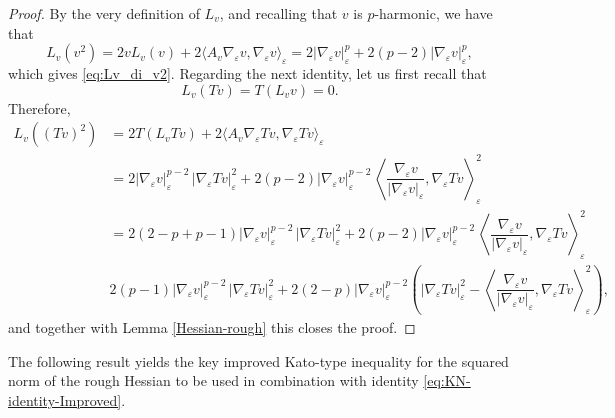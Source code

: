 \documentclass[10pt]{amsart}
\numberwithin{equation}{section}
\theoremstyle{definition}
\begin{document}
	\begin{proof}
		By the very definition of $L_v$, and recalling that $v$ is $p$-harmonic, we have that
		\begin{equation}
			L_{v}(v^2) = 2v L_{v}(v) + 2 \langle A_{v}\nabla_{\varepsilon}v, \nabla_{\varepsilon}v\rangle_{\varepsilon} = 2|\nabla_{\varepsilon}v|^{p}_{\varepsilon}+ 2(p-2) |\nabla_{\varepsilon}v|_{\varepsilon}^{p},
		\end{equation}
		\noindent which gives \eqref{eq:Lv_di_v2}.
		Regarding the next identity, let us first recall that
		\begin{equation}
			L_{v}(T v) = T (L_{v}v) =0.
		\end{equation}
		Therefore,
		\begin{equation}
			\begin{aligned}
				L_{v}((T v)^2) &= 2 T (L_{v}T v) + 2\langle A_v \nabla_{\varepsilon}T v, \nabla_{\varepsilon}T v \rangle_{\varepsilon}\\
				&= 2 |\nabla_{\varepsilon}v|_{\varepsilon}^{p-2}\,|\nabla_{\varepsilon}T v|_{\varepsilon}^{2} + 2(p-2)|\nabla_{\varepsilon}v|_{\varepsilon}^{p-2}\, \left\langle\dfrac{\nabla_{\varepsilon}v}{|\nabla_{\varepsilon}v|_{\varepsilon}}, \nabla_{\varepsilon}T v\right\rangle_{\varepsilon}^2\\
				&=2 (2-p+p-1)|\nabla_{\varepsilon}v|_{\varepsilon}^{p-2}\,|\nabla_{\varepsilon}T v|_{\varepsilon}^{2} + 2(p-2)|\nabla_{\varepsilon}v|_{\varepsilon}^{p-2}\, \left\langle\dfrac{\nabla_{\varepsilon}v}{|\nabla_{\varepsilon}v|_{\varepsilon}}, \nabla_{\varepsilon}T v\right\rangle_{\varepsilon}^2\\
				&2(p-1)|\nabla_{\varepsilon}v|_{\varepsilon}^{p-2}\,|\nabla_{\varepsilon}T v|_{\varepsilon}^{2} + 2(2-p)|\nabla_{\varepsilon}v|^{p-2}_{\varepsilon} \left(|\nabla_{\varepsilon}T v|^{2}_{\varepsilon} - \left\langle\dfrac{\nabla_{\varepsilon}v}{|\nabla_{\varepsilon}v|_{\varepsilon}}, \nabla_{\varepsilon}T v\right\rangle_{\varepsilon}^2\right),
			\end{aligned}
		\end{equation}
		\noindent and together with Lemma \ref{Hessian-rough} this closes the proof.		
	\end{proof}
	
	The following result yields the key improved Kato-type inequality for the squared norm of the rough Hessian to be used in combination with identity \eqref{eq:KN-identity-Improved}. 
\end{document}
